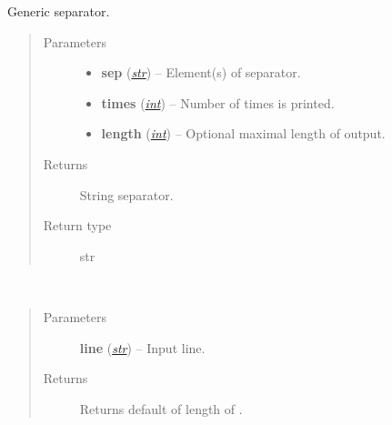 \documentclass[a4paper,10pt,english]{sphinxmanual}
\begin{document}

\begin{fulllineitems}
\label{aqueduct.utils.log:aqueduct.utils.log.gsep}
Generic separator.
\begin{quote}\begin{description}
\item[{Parameters}] \leavevmode\begin{itemize}
\item {} 
\textbf{sep} (\href{http://docs.python.org/2/library/functions.html\#str}{\emph{str}}) -- Element(s) of separator.

\item {} 
\textbf{times} (\href{http://docs.python.org/2/library/functions.html\#int}{\emph{int}}) -- Number of times  is printed.

\item {} 
\textbf{length} (\href{http://docs.python.org/2/library/functions.html\#int}{\emph{int}}) -- Optional maximal length of output.

\end{itemize}

\item[{Returns}] \leavevmode
String separator.

\item[{Return type}] \leavevmode
str

\end{description}\end{quote}

\end{fulllineitems}


\begin{fulllineitems}
\label{aqueduct.utils.log:aqueduct.utils.log.tsep}~\begin{quote}\begin{description}
\item[{Parameters}] \leavevmode
\textbf{line} (\href{http://docs.python.org/2/library/functions.html\#str}{\emph{str}}) -- Input line.

\item[{Returns}] \leavevmode
Returns default {\hyperref[aqueduct.utils.log:aqueduct.utils.log.gsep]{}} of length of .

\end{description}\end{quote}

\end{fulllineitems}
\end{document}
